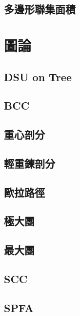 \documentclass[a4paper,10pt,twocolumn,oneside]{article}
\begin{document}
\subsection{多邊形聯集面積}

%


\section{圖論}
\subsection{DSU on Tree}

\subsection{BCC}

\subsection{重心剖分}

\subsection{輕重鍊剖分}

\subsection{歐拉路徑}

\subsection{極大團}

\subsection{最大團}

\subsection{SCC}

\subsection{SPFA}

\end{document}
